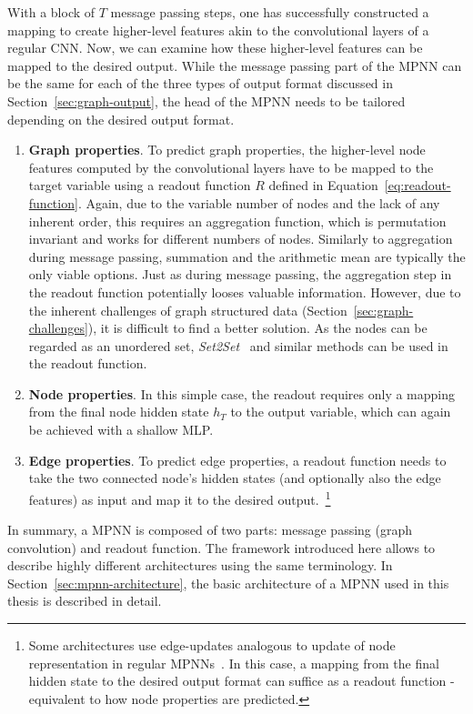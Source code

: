 With a block of $T$ message passing steps, one has successfully constructed a mapping to create higher-level features akin to the convolutional layers of a regular CNN. Now, we can examine how these higher-level features can be mapped to the desired output. While the message passing part of the MPNN can be the same for each of the three types of output format discussed in Section~\ref{sec:graph-output}, the head of the MPNN needs to be tailored depending on the desired output format.

\begin{enumerate}
	\item \textbf{Graph properties}. To predict graph properties, the higher-level node features computed by the convolutional layers have to be mapped to the target variable using a readout function $R$ defined in Equation~\ref{eq:readout-function}. Again, due to the variable number of nodes and the lack of any inherent order, this requires an aggregation function, which is permutation invariant and works for different numbers of nodes. Similarly to aggregation during message passing, summation and the arithmetic mean are typically the only viable options.
	Just as during message passing, the aggregation step in the readout function potentially looses valuable information. However, due to the inherent challenges of graph structured data (Section~\ref{sec:graph-challenges}), it is difficult to find a better solution. As the nodes can be regarded as an unordered set, \textit{Set2Set}~\cite{Vinyals2015} and similar methods can be used in the readout function.
	\item \textbf{Node properties}. In this simple case, the readout requires only a mapping from the final node hidden state $h_T$ to the output variable, which can again be achieved with a shallow MLP.
	\item \textbf{Edge properties}. To predict edge properties, a readout function needs to take the two connected node's hidden states (and optionally also the edge features) as input and map it to the desired output.~\footnote{Some architectures use edge-updates analogous to update of node representation in regular MPNNs~\cite{Jørgensen2018}. In this case, a mapping from the final hidden state to the desired output format can suffice as a readout function - equivalent to how node properties are predicted.}
\end{enumerate}


In summary, a MPNN is composed of two parts: message passing (graph convolution) and readout function. The framework introduced here allows to describe highly different architectures using the same terminology. In Section~\ref{sec:mpnn-architecture}, the basic architecture of a MPNN used in this thesis is described in detail.

